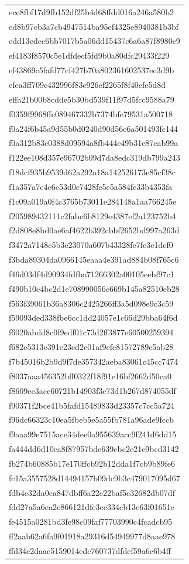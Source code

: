 \begin{tabular}{l}
ece8fbf17d9fb152df25b4d68ffdd016a246a580b2 \\
ed8b97eb3a7cb4947514ba95ef4325e8940381b3bf \\
edd13cdec6bb7017b5a06dd15437c6a6a87f8980c9 \\
ef4183f8570c5e1dfdecf5fd9b0a80dfc29433f229 \\
ef43869c5fafd77cf427b70a802361602537ec3d9b \\
efea3ff709c432996f83e926cf2265f8f40cfe5d8d \\
effa21b00b8cdde5b30bd539f11f97d5fcc9588a79 \\
f0359f9968ffc089467332b7374bfe79531a500718 \\
f0a24f6b45a9d55b0d0240d90d56c6a501493fc144 \\
f0a312b83c0388d09594a8fb444c49b31e87cab99a \\
f122ee108d357e96702b09d7da8edc319db799a243 \\
f18dcf935b9539d62a292a18a142526173e85cf38c \\
f1a357a7c4e6c53d0c7428fe5c5a584fe33b4353fa \\
f1c09a019a0f4c3765b73011e284148a1aa766245e \\
f205989432111c2fabe6b8129e4387ef2a123752b4 \\
f2d808e8bd0ae6af4622b392cbbf2652bd997a263d \\
f3472a7148c5b3e23070a607b43328fe7fe3e1dcf0 \\
f3bda89304da0966145eaaa4e391ad884b08f765c6 \\
f46d03df4d90934fdfba71266302a00105eebf97c1 \\
f490b10e4bc2d1e708990056c669b145a82510eb28 \\
f563f39061b36a8306c2425266ff3a5d098e9c3c59 \\
f59093ded338fbe6cc1dd24057e1c66d29bba64f6d \\
f6020abdd8c0f9edf01c73d2ff3877e60500259394 \\
f682e5313c391e23ed2e01af9cfe81572789c5ab28 \\
f7b45016b2b9d9f7de357342aeba83061c45cc7474 \\
f8037aaa456352bff0322f18f91e16bf2662d50ca0 \\
f8609ec3acc60721b14903f3c73d1b267d874055df \\
f90371f2bce41b5fafd15489833d23357c7cc5a724 \\
f96dc66323c10ea5fbeb5e5a55fb781a96ade9fccb \\
f9aaa99e7515ace34dee0a955639acc9f241d6dd15 \\
fa444dd6d10ea8f87957bde639cbc2e21c9bcd3142 \\
fb274b60885b17e170ffcb92b12dda1f7cb9b89fe6 \\
fc15a3557528d14494157b09dc9b3c479017095d67 \\
fdb4c32da0ca847dbff6a22e22baf5c32682db07df \\
fdd27a5a6ea2e866121dfe3cc334cb13e63f01651c \\
fe4515a0281bd3fe98c09faf77703990c4fcadcb95 \\
ff2aab62a6fa9f01918a29316d54949977d8aae978 \\
ffd34e2daac5159014edc760737dfdcf59a6c6b4ff \\
\bottomrule
\end{tabular}
